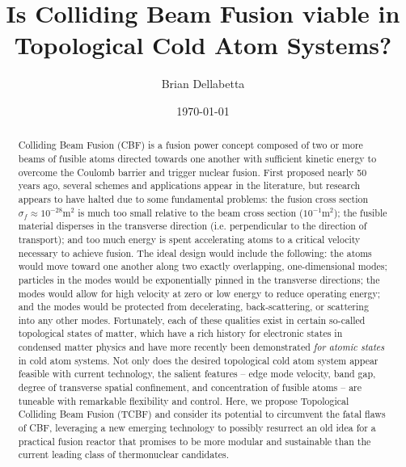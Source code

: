 \documentclass[onecolumn,
               superscriptaddress,
               floatfix,
               longbibliography, 
               showkeys,apl]{revtex4-2}
\begin{document}
\title{Is Colliding Beam Fusion viable in Topological Cold Atom Systems?}

\author{Brian Dellabetta}


\date{\today}
%
\begin{abstract}
Colliding Beam Fusion (CBF) is a fusion power concept composed of two or more beams of fusible atoms directed towards one another with sufficient kinetic energy to overcome the Coulomb barrier and trigger nuclear fusion. First proposed nearly 50 years ago, several schemes and applications appear in the literature, but research appears to have halted due to some fundamental problems: the fusion cross section $\sigma_f \approx 10^{-28} \textrm{m}^2$ is much too small relative to the beam cross section ($10^{-1} \textrm{m}^2$); the fusible material disperses in the transverse direction (i.e. perpendicular to the direction of transport); and too much energy is spent accelerating atoms to a critical velocity necessary to achieve fusion. The ideal design would include the following: the atoms would move toward one another along two exactly overlapping, one-dimensional modes; particles in the modes would be exponentially pinned in the transverse directions; the modes would allow for high velocity at zero or low energy to reduce operating energy; and the modes would be protected from decelerating, back-scattering, or scattering into any other modes. Fortunately, each of these qualities exist in certain so-called topological states of matter, which have a rich history for electronic states in condensed matter physics and have more recently been demonstrated \textit{for atomic states} in cold atom systems. Not only does the desired topological cold atom system appear feasible with current technology, the salient features -- edge mode velocity, band gap, degree of transverse spatial confinement, and concentration of fusible atoms -- are tuneable with remarkable flexibility and control. Here, we propose Topological Colliding Beam Fusion (TCBF) and consider its potential to circumvent the fatal flaws of CBF, leveraging a new emerging technology to possibly resurrect an old idea for a practical fusion reactor that promises to be more modular and sustainable than the current leading class of thermonuclear candidates.

\end{abstract}
\end{document}
